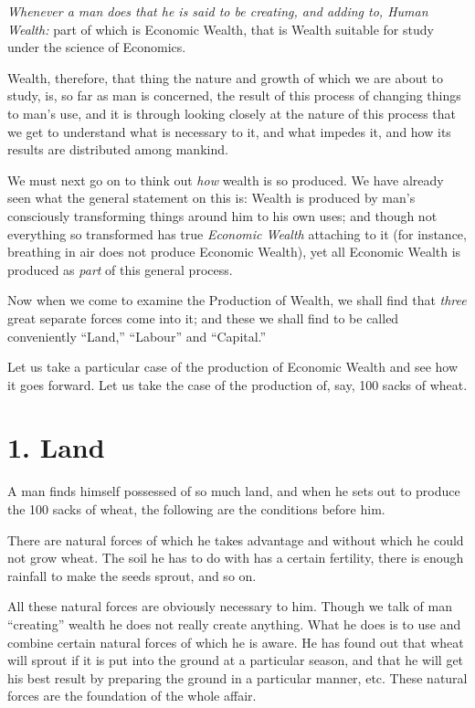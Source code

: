 \documentclass{book}
\begin{document}
\emph{Whenever a man does that he is said to be creating, and adding to, Human Wealth:} part of which is Economic Wealth, that is Wealth suitable for study under the science of Economics.

Wealth, therefore, that thing the nature and growth of which we are about to study, is, so far as man is concerned, the result of this process of changing things to man’s use, and it is through looking closely at the nature of this process that we get to understand what is necessary to it, and what impedes it, and how its results are distributed among mankind.

We must next go on to think out \emph{how} wealth is so produced. We have already seen what the general statement on this is: Wealth is produced by man’s consciously transforming things around him to his own uses; and though not everything so transformed has true \emph{Economic Wealth} attaching to it (for instance, breathing in air does not produce Economic Wealth), yet all Economic Wealth is produced as \emph{part} of this general process.

Now when we come to examine the Production of Wealth, we shall find that \emph{three} great separate forces come into it; and these we shall find to be called conveniently “Land,” “Labour” and “Capital.”

Let us take a particular case of the production of Economic Wealth and see how it goes forward. Let us take the case of the production of, say, 100 sacks of wheat.

\section{1. Land}
A man finds himself possessed of so much land, and when he sets out to produce the 100 sacks of wheat, the following are the conditions before him.

There are natural forces of which he takes advantage and without which he could not grow wheat. The soil he has to do with has a certain fertility, there is enough rainfall to make the seeds sprout, and so on.

All these natural forces are obviously necessary to him. Though we talk of man “creating” wealth he does not really create anything. What he does is to use and combine certain natural forces of which he is aware. He has found out that wheat will sprout if it is put into the ground at a particular season, and that he will get his best result by preparing the ground in a particular manner, etc. These natural forces are the foundation of the whole affair.
\end{document}

